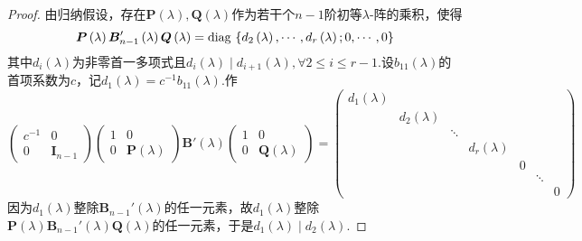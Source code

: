 {\begin{proof}
        由归纳假设，存在$\bm{P}\left(\lambda\right),\bm{Q}\left(\lambda\right)$作为若干个$n-1$阶初等$\lambda$-阵的乘积，使得
        \[
            \bm{P}\left(\lambda\right)\bm{B}_{n-1}'\left(\lambda\right)\bm{Q}\left(\lambda\right)=\operatorname{diag\,} \left\{
            d_2\left(\lambda\right),\cdots,d_r\left(\lambda\right);0,\cdots,0
            \right\}
        \]
        其中$d_i\left(\lambda\right)$为非零首一多项式且$d_i\left(\lambda\right)\mid d_{i+1}\left(\lambda\right),\forall 2\leqslant i\leqslant r-1$.设$b_{11}\left(\lambda\right)$的首项系数为$c$，记$d_1\left(\lambda\right)=c^{-1}b_{11}\left(\lambda\right).$作
        \[
            \begin{pmatrix}
                c^{-1} & 0 \\0 & \bm{I}_{n-1}
            \end{pmatrix}\begin{pmatrix}
                1 & 0 \\0 & \bm{P}\left(\lambda\right)
            \end{pmatrix}\bm{B}'\left(\lambda\right)\begin{pmatrix}
                1 & 0 \\0 & \bm{Q}\left(\lambda\right)
            \end{pmatrix}=
            \begin{pmatrix}
                d_1\left(\lambda\right) &                         &        &                         &   &        &   \\
                                        & d_2\left(\lambda\right) &        &                         &   &        &   \\
                                        &                         & \ddots &                         &   &        &   \\
                                        &                         &        & d_r\left(\lambda\right) &   &        &   \\
                                        &                         &        &                         & 0 &        &   \\
                                        &                         &        &                         &   & \ddots &   \\
                                        &                         &        &                         &   &        & 0
            \end{pmatrix}
        \]因为$d_1\left(\lambda\right)$整除$\bm{B}_{n-1}'\left(\lambda\right)$的任一元素，故$d_1\left(\lambda\right)$整除$\bm{P}\left(\lambda\right)\bm{B}_{n-1}'\left(\lambda\right)\bm{Q}\left(\lambda\right)$的任一元素，于是$d_1\left(\lambda\right)\mid d_2\left(\lambda\right)$.
    \end{proof}
}

